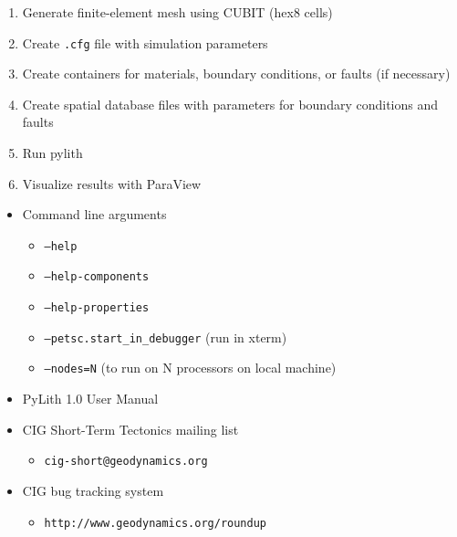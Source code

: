 \documentclass[pdftex,cig,slideColor]{pp4slides}
\begin{document}

  \vfill

  \summary{}

  \begin{enumerate}
  \item Generate finite-element mesh using CUBIT (hex8 cells)
  \item Create {\tt .cfg} file with simulation parameters
  \item Create containers for materials, boundary conditions, or
    faults (if necessary)
  \item Create spatial database files with parameters for boundary
    conditions and faults
  \item Run pylith
  \item Visualize results with ParaView
  \end{enumerate}

  \summary{}

  \begin{itemize}
  \item Command line arguments
    \begin{itemize}
    \item {\tt --help}
    \item {\tt --help-components}
    \item {\tt --help-properties}
    \item {\tt --petsc.start\_in\_debugger} (run in xterm)
    \item {\tt --nodes=N} (to run on N processors on local machine)
    \end{itemize}
  \item PyLith 1.0 User Manual
  \item CIG Short-Term Tectonics mailing list
    \begin{itemize}
    \item {\tt cig-short@geodynamics.org}
    \end{itemize}
  \item CIG bug tracking system
    \begin{itemize}
    \item {\tt http://www.geodynamics.org/roundup}
    \end{itemize}
  \end{itemize}
\end{document}
